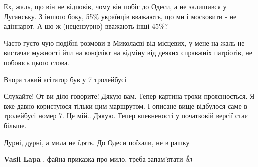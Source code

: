 \begin{itemize}
Ех, жаль, що він не відповів, чому він побіг до Одеси, а не залишився у Луганську.
З іншого боку, 55\% українців вважають, що ми і московити - не адіннарот. А шо ж (нецензурно) вважають інші 45\%?

 

Часто-густо чую подібні розмови в Миколаєві від місцевих, у мене на жаль не
вистачає мужності йти на конфлікт на відміну від деяких справжніх патріотів, не
побоюсь цього слова.


 
Вчора такий агітатор був у 7 тролейбусі

\begin{itemize}
 

Слухайте! От ви діло говорите! Дякую вам. Тепер картина трохи прояснюється. Я
вже давно користуюся тільки цим маршрутом. І описане вище відбулося саме в
тролейбусі номер 7. Це мій.. Дякую. Тепер впевненості у початковій версії стає
більше.
\end{itemize}

 
Дурні, дурні, а мила не їдять.
До Одеси поїхали, не в рашку

\begin{itemize}
 
\textbf{Vasil Lapa} , файна приказка про мило, треба запам'ятати 👍
\end{itemize}


\end{itemize}
